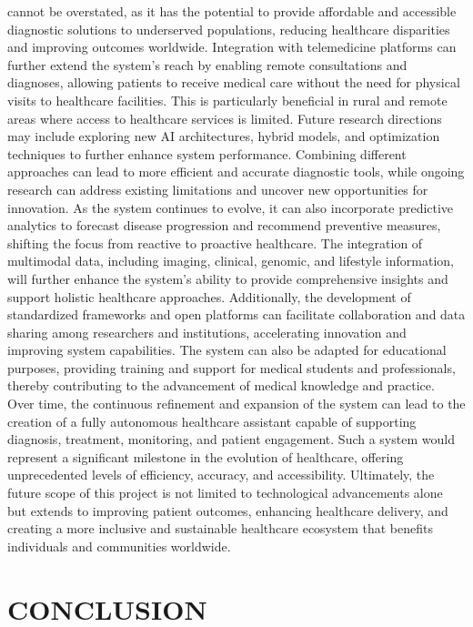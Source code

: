\documentclass[a4paper,12pt]{report}
\begin{document}
\begin{doublespace}
cannot be overstated, as it has the potential to provide affordable and accessible diagnostic solutions to underserved populations, reducing healthcare disparities and improving outcomes worldwide. Integration with telemedicine platforms can further extend the system’s reach by enabling remote consultations and diagnoses, allowing patients to receive medical care without the need for physical visits to healthcare facilities. This is particularly beneficial in rural and remote areas where access to healthcare services is limited. Future research directions may include exploring new AI architectures, hybrid models, and optimization techniques to further enhance system performance.
 Combining different approaches can lead to more efficient and accurate diagnostic tools, while ongoing research can address existing limitations and uncover new opportunities for innovation. As the system continues to evolve, it can also incorporate predictive analytics to forecast disease progression and recommend preventive measures, shifting the focus from reactive to proactive healthcare. The integration of multimodal data, including imaging, clinical, genomic, and lifestyle information, will further enhance the system’s ability to provide comprehensive insights and support holistic healthcare approaches. Additionally, the development of standardized frameworks and open platforms can facilitate collaboration and data sharing among researchers and institutions, accelerating innovation and improving system capabilities. The system can also be adapted for educational purposes, providing training and support for medical students and professionals, thereby contributing to the advancement of medical knowledge and practice. Over time, the continuous refinement and expansion of the system can lead to the creation of a fully autonomous healthcare assistant capable of supporting diagnosis, treatment, monitoring, and patient engagement. Such a system would represent a significant milestone in the evolution of healthcare, offering unprecedented levels of efficiency, accuracy, and accessibility. Ultimately, the future scope of this project is not limited to technological advancements alone but extends to improving patient outcomes, enhancing healthcare delivery, and creating a more inclusive and sustainable healthcare ecosystem that benefits individuals and communities worldwide.
\end{doublespace}
\newpage
\chapter{CONCLUSION}
\label{chap:conclusion}
\end{document}
